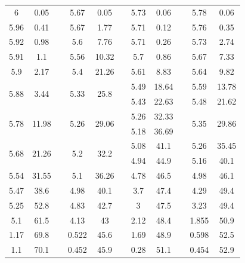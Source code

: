 \documentclass[%
 aip,
 amsmath,amssymb,
 reprint, floatfix%
]{revtex4-2}
\begin{document}
\begin{table}[]
\begin{tabular}{@{}ccccccccccc@{}}
    6 & 0.05 &  & 5.67 & 0.05 &  & 5.73 & 0.06 &  & 5.78 & 0.06 \\
    5.96 & 0.41 &  & 5.67 & 1.77 &  & 5.71 & 0.12 &  & 5.76 & 0.35 \\
    5.92 & 0.98 &  & 5.6 & 7.76 &  & 5.71 & 0.26 &  & 5.73 & 2.74 \\
    5.91 & 1.1 &  & 5.56 & 10.32 &  & 5.7 & 0.86 &  & 5.67 & 7.33 \\
    5.9 & 2.17 &  & 5.4 & 21.26 &  & 5.61 & 8.83 &  & 5.64 & 9.82 \\
    \multirow{2}{*}{5.88} & \multirow{2}{*}{3.44} &  & \multirow{2}{*}{5.33} & \multirow{2}{*}{25.8} &  & 5.49 & 18.64 &  & 5.59 & 13.78 \\
     &  &  &  &  &  & 5.43 & 22.63 &  & 5.48 & 21.62 \\
    \multirow{2}{*}{5.78} & \multirow{2}{*}{11.98} &  & \multirow{2}{*}{5.26} & \multirow{2}{*}{29.06} &  & 5.26 & 32.33 &  & \multirow{2}{*}{5.35} & \multirow{2}{*}{29.86} \\
     &  &  &  &  &  & 5.18 & 36.69 &  &  &  \\
    \multirow{2}{*}{5.68} & \multirow{2}{*}{21.26} &  & \multirow{2}{*}{5.2} & \multirow{2}{*}{32.2} &  & 5.08 & 41.1 &  & 5.26 & 35.45 \\
     &  &  &  &  &  & 4.94 & 44.9 &  & 5.16 & 40.1 \\
    5.54 & 31.55 &  & 5.1 & 36.26 &  & 4.78 & 46.5 &  & 4.98 & 46.1 \\
    5.47 & 38.6 &  & 4.98 & 40.1 &  & 3.7 & 47.4 &  & 4.29 & 49.4 \\
    5.25 & 52.8 &  & 4.83 & 42.7 &  & 3 & 47.5 &  & 3.23 & 49.4 \\
    5.1 & 61.5 &  & 4.13 & 43 &  & 2.12 & 48.4 &  & 1.855 & 50.9 \\
    1.17 & 69.8 &  & 0.522 & 45.6 &  & 1.69 & 48.9 &  & 0.598 & 52.5 \\
    1.1 & 70.1 &  & 0.452 & 45.9 &  & 0.28 & 51.1 &  & 0.454 & 52.9 \\ \bottomrule
    \end{tabular}
    \end{table}
    
\end{document}
